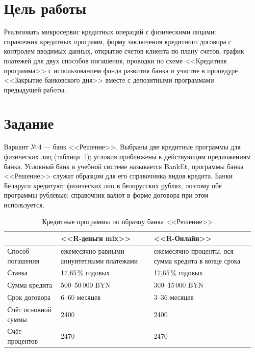 \documentclass[14pt,a4paper]{extarticle}
\begin{document}

\tableofcontents

\section{Цель работы}

Реализовать микросервис кредитных операций с физическими лицами: справочник кредитных
программ, форму заключения кредитного договора с контролем вводимых данных, открытие счетов
клиента по плану счетов, график платежей для двух способов погашения, проводки по схеме
<<Кредитная программа>> с использованием фонда развития банка и участие в процедуре
<<Закрытие банковского дня>> вместе с депозитными программами предыдущей работы.

\section{Задание}

Вариант №\,4 --- банк <<Решение>>. Выбраны две кредитные программы для физических лиц
(таблица~\ref{tab:products}); условия приближены к действующим предложениям банка. Условный
банк в учебной системе называется BankEt, программы банка <<Решение>> служат образцом для
его справочника видов кредита.
Банки Беларуси кредитуют физических лиц в белорусских рублях, поэтому обе программы
рублёвые; справочник валют в форме договора при этом используется.

\begin{table}[H]
\caption{Кредитные программы по образцу банка <<Решение>>}
\label{tab:products}
\centering
\small
\begin{tabularx}{\textwidth}{lXX}
\toprule
 & <<R-деньги mix>> & <<R-Онлайн>> \\
\midrule
Способ погашения & ежемесячно равными аннуитетными платежами & ежемесячно проценты, вся сумма кредита в конце срока \\
Ставка & 17,65\,\% годовых & 17,65\,\% годовых \\
Сумма кредита & 500--50\,000 BYN & 300--15\,000 BYN \\
Срок договора & 6--60 месяцев & 3--36 месяцев \\
Счёт основной суммы & 2400 & 2400 \\
Счёт процентов & 2470 & 2470 \\
\bottomrule
\end{tabularx}
\end{table}
\end{document}
